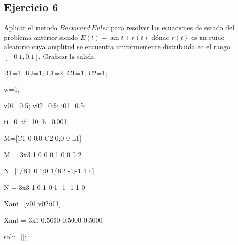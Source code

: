 \documentclass[10pt,a4paper]{article} %
\begin{document}
	
	\subsection{Ejercicio 6} Aplicar el metodo $Backward\ Euler$ para resolver las ecuaciones de estado del problema anterior siendo $E(t)=\sin t + r(t)$ dónde $r(t)$ es un ruido aleatorio cuya amplitud se encuentra uniformemente distribuida en el rango $[-0.1,0.1]$. Graficar la salida.\\
	
	
	\begin{matlabcode}
		R1=1;
		R2=1;
		L1=2;
		C1=1;
		C2=1;
		
		w=1;
	\end{matlabcode}
	
	
	\begin{matlabcode}
		v01=0.5;
		v02=0.5;
		i01=0.5;
	\end{matlabcode}
	
	
	\begin{matlabcode}
		ti=0;
		tf=10;
		h=0.001;
	\end{matlabcode}
	
	
	\begin{matlabcode}
		M=[C1 0 0;0 C2 0;0 0 L1]
	\end{matlabcode}
	\begin{matlaboutput}
		M = 3x3    
		1     0     0
		0     1     0
		0     0     2
		
	\end{matlaboutput}
	\begin{matlabcode}
		N=[1/R1 0 1;0 1/R2 -1;-1 1 0]
	\end{matlabcode}
	\begin{matlaboutput}
		N = 3x3    
		1     0     1
		0     1    -1
		-1     1     0
		
	\end{matlaboutput}
	\begin{matlabcode}
		Xant=[v01;v02;i01]
	\end{matlabcode}
	\begin{matlaboutput}
		Xant = 3x1    
		0.5000
		0.5000
		0.5000
		
	\end{matlaboutput}
	\begin{matlabcode}
		solu=[];
	\end{matlabcode}
	
\end{document}
